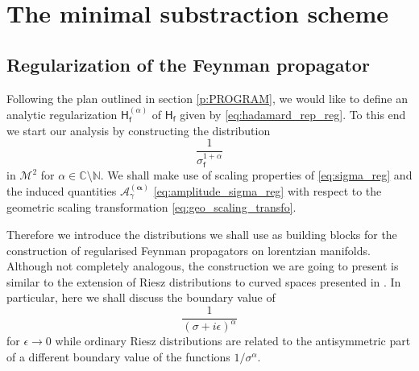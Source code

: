 \documentclass[12pt]{book}
\newcommand{\Acal}{\mathcal{A}}
\newcommand{\Mcal}{\mathcal{M}}
\newcommand{\Cbb}{\mathbb{C}}
\newcommand{\Nbb}{\mathbb{N}}
\newcommand{\Hsf}{\mathsf{H}}
\newcommand{\fsf}{\mathsf{f}}
\theoremstyle{break}
\begin{document}
\section{The minimal substraction scheme}


\subsection{Regularization of the Feynman propagator}\label{p:REG_FEYNMAN_PROP}


Following the plan outlined in section \ref{p:PROGRAM}, we would like to define an analytic regularization $\Hsf^{(\alpha)}_\fsf$ of $\Hsf_\fsf$ given by \eqref{eq:hadamard_rep_reg}. To this end we start our analysis by constructing the distribution 
%
\begin{equation}
\frac{1}{\sigma_\fsf^{1+\alpha}}
\label{eq:sigma_reg}
\end{equation}
%
in $\Mcal^2$ for $\alpha \in \Cbb \setminus \Nbb$. We shall make use of scaling properties of
\eqref{eq:sigma_reg} and the induced quantities $\Acal^{(\boldsymbol{\alpha})}_\gamma$ \eqref{eq:amplitude_sigma_reg} with respect to the geometric scaling transformation \eqref{eq:geo_scaling_transfo}.


Therefore we introduce the distributions we shall use as building blocks for the construction of regularised Feynman propagators on lorentzian manifolds. Although not completely analogous, the construction we are going to present is similar  to the extension of Riesz distributions to curved spaces presented in \cite{baer_wave_2008}. In particular, here we shall discuss the boundary value of 
%
\begin{equation*}
\frac{1}{(\sigma+i\epsilon)^{\alpha}}
\end{equation*}
%
for $\epsilon\to0$ while ordinary Riesz distributions are related to the antisymmetric part of a different boundary value of the functions $1/\sigma^\alpha$.
\end{document}
